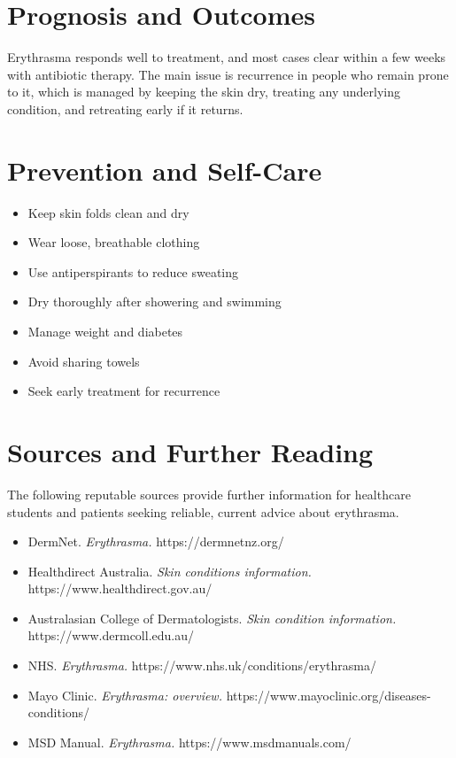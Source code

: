 \section*{Prognosis and Outcomes}
Erythrasma responds well to treatment, and most cases clear within a few weeks with antibiotic therapy. The main issue is recurrence in people who remain prone to it, which is managed by keeping the skin dry, treating any underlying condition, and retreating early if it returns.

\section*{Prevention and Self-Care}
\begin{itemize}
    \item Keep skin folds clean and dry
    \item Wear loose, breathable clothing
    \item Use antiperspirants to reduce sweating
    \item Dry thoroughly after showering and swimming
    \item Manage weight and diabetes
    \item Avoid sharing towels
    \item Seek early treatment for recurrence
\end{itemize}

\section*{Sources and Further Reading}
The following reputable sources provide further information for healthcare students and patients seeking reliable, current advice about erythrasma.
\begin{itemize}
    \item DermNet. \textit{Erythrasma.} https://dermnetnz.org/
    \item Healthdirect Australia. \textit{Skin conditions information.} https://www.healthdirect.gov.au/
    \item Australasian College of Dermatologists. \textit{Skin condition information.} https://www.dermcoll.edu.au/
    \item NHS. \textit{Erythrasma.} https://www.nhs.uk/conditions/erythrasma/
    \item Mayo Clinic. \textit{Erythrasma: overview.} https://www.mayoclinic.org/diseases-conditions/
    \item MSD Manual. \textit{Erythrasma.} https://www.msdmanuals.com/
\end{itemize}
